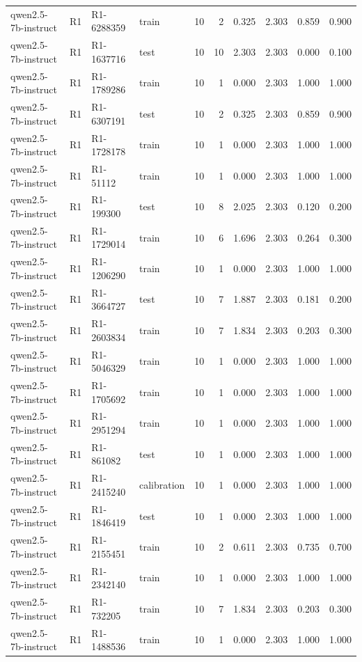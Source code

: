 \begin{table}
\begin{tabular}{llllrrrrrr}
qwen2.5-7b-instruct & R1 & R1-6288359 & train & 10 & 2 & 0.325 & 2.303 & 0.859 & 0.900 \\
qwen2.5-7b-instruct & R1 & R1-1637716 & test & 10 & 10 & 2.303 & 2.303 & 0.000 & 0.100 \\
qwen2.5-7b-instruct & R1 & R1-1789286 & train & 10 & 1 & 0.000 & 2.303 & 1.000 & 1.000 \\
qwen2.5-7b-instruct & R1 & R1-6307191 & test & 10 & 2 & 0.325 & 2.303 & 0.859 & 0.900 \\
qwen2.5-7b-instruct & R1 & R1-1728178 & train & 10 & 1 & 0.000 & 2.303 & 1.000 & 1.000 \\
qwen2.5-7b-instruct & R1 & R1-51112 & train & 10 & 1 & 0.000 & 2.303 & 1.000 & 1.000 \\
qwen2.5-7b-instruct & R1 & R1-199300 & test & 10 & 8 & 2.025 & 2.303 & 0.120 & 0.200 \\
qwen2.5-7b-instruct & R1 & R1-1729014 & train & 10 & 6 & 1.696 & 2.303 & 0.264 & 0.300 \\
qwen2.5-7b-instruct & R1 & R1-1206290 & train & 10 & 1 & 0.000 & 2.303 & 1.000 & 1.000 \\
qwen2.5-7b-instruct & R1 & R1-3664727 & test & 10 & 7 & 1.887 & 2.303 & 0.181 & 0.200 \\
qwen2.5-7b-instruct & R1 & R1-2603834 & train & 10 & 7 & 1.834 & 2.303 & 0.203 & 0.300 \\
qwen2.5-7b-instruct & R1 & R1-5046329 & train & 10 & 1 & 0.000 & 2.303 & 1.000 & 1.000 \\
qwen2.5-7b-instruct & R1 & R1-1705692 & train & 10 & 1 & 0.000 & 2.303 & 1.000 & 1.000 \\
qwen2.5-7b-instruct & R1 & R1-2951294 & train & 10 & 1 & 0.000 & 2.303 & 1.000 & 1.000 \\
qwen2.5-7b-instruct & R1 & R1-861082 & test & 10 & 1 & 0.000 & 2.303 & 1.000 & 1.000 \\
qwen2.5-7b-instruct & R1 & R1-2415240 & calibration & 10 & 1 & 0.000 & 2.303 & 1.000 & 1.000 \\
qwen2.5-7b-instruct & R1 & R1-1846419 & test & 10 & 1 & 0.000 & 2.303 & 1.000 & 1.000 \\
qwen2.5-7b-instruct & R1 & R1-2155451 & train & 10 & 2 & 0.611 & 2.303 & 0.735 & 0.700 \\
qwen2.5-7b-instruct & R1 & R1-2342140 & train & 10 & 1 & 0.000 & 2.303 & 1.000 & 1.000 \\
qwen2.5-7b-instruct & R1 & R1-732205 & train & 10 & 7 & 1.834 & 2.303 & 0.203 & 0.300 \\
qwen2.5-7b-instruct & R1 & R1-1488536 & train & 10 & 1 & 0.000 & 2.303 & 1.000 & 1.000 \\

\end{tabular}
\end{table}
